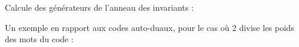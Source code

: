 \begin{maplegroup}
\begin{flushleft}
Calcule des générateurs de l'anneau des invariants :
\end{flushleft}

\end{maplegroup}
\begin{maplegroup}
\begin{mapleinput}
\end{mapleinput}

\end{maplegroup}
\begin{maplegroup}
\begin{flushleft}
Un exemple en rapport aux codes auto-duaux, pour le cas où 2 divise
les poids des mots du code :
\end{flushleft}

\end{maplegroup}

